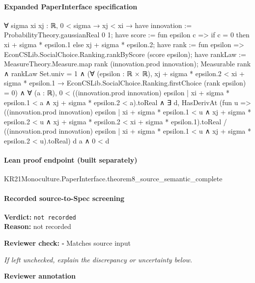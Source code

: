 \documentclass[10pt]{article}
\newcommand{\reviewerbox}{%
  \par\noindent\fbox{\parbox{0.96\linewidth}{\rule{0pt}{0.38in}}}\par
}
\newcommand{\reviewmatch}[1]{%
  \par\noindent\textbf{Reviewer check:} $\square$\; #1\par
  \noindent\emph{If left unchecked, explain the discrepancy or uncertainty below.}\par
}
\begin{document}
\paragraph{Expanded PaperInterface specification}
\begin{ReviewVerbatim}
∀ {sigma xi xj : ℝ},
  0 < sigma →
    xj < xi →
      have innovation := ProbabilityTheory.gaussianReal 0 1;
      have score := fun epsilon c => if c = 0 then xi + sigma * epsilon.1 else xj + sigma * epsilon.2;
      have rank := fun epsilon => EconCSLib.SocialChoice.Ranking.rankByScore (score epsilon);
      have rankLaw := MeasureTheory.Measure.map rank (innovation.prod innovation);
      Measurable rank ∧
        rankLaw Set.univ = 1 ∧
          (∀ (epsilon : ℝ × ℝ),
              xj + sigma * epsilon.2 < xi + sigma * epsilon.1 →
                EconCSLib.SocialChoice.Ranking.firstChoice (rank epsilon) = 0) ∧
            ∀ (a : ℝ),
              0 <
                  ((innovation.prod innovation)
                      {epsilon | xi + sigma * epsilon.1 < a ∧ xj + sigma * epsilon.2 < a}).toReal ∧
                ∃ d,
                  HasDerivAt
                      (fun u =>
                        ((innovation.prod innovation)
                              {epsilon |
                                xi + sigma * epsilon.1 < u ∧
                                  xj + sigma * epsilon.2 < u ∧
                                    xj + sigma * epsilon.2 < xi + sigma * epsilon.1}).toReal /
                          ((innovation.prod innovation)
                              {epsilon | xi + sigma * epsilon.1 < u ∧ xj + sigma * epsilon.2 < u}).toReal)
                      d a ∧
                    0 < d
\end{ReviewVerbatim}

\paragraph{Lean proof endpoint (built separately)}\begin{ReviewVerbatim}
KR21Monoculture.PaperInterface.theorem8_source_semantic_complete
\end{ReviewVerbatim}

\paragraph{Recorded source-to-Spec screening}
\textbf{Verdict:} \texttt{not recorded}
\\
\textbf{Reason:} not recorded
\reviewmatch{Matches source input}
\noindent\textbf{Reviewer annotation}\par
\reviewerbox
\clearpage
\hypertarget{source-claim-43364c7dea10aac0}{}
\end{document}
